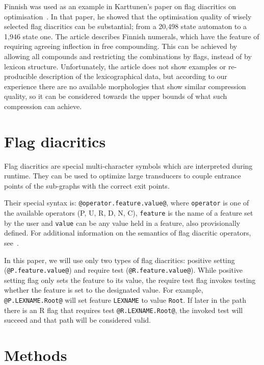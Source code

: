 \documentclass[10pt, a4paper]{article}
\begin{document}
Finnish was used as an example in Karttunen's paper on flag diacritics
on optimisation~. In that paper, he
showed that the optimisation quality of wisely selected flag
diacritics can be substantial; from a 20,498 state automaton to a
1,946 state one. The article describes Finnish numerals, which have
the feature of requiring agreeing inflection in free compounding. This
can be achieved by allowing all compounds and restricting the
combinations by flags, instead of by lexicon structure. Unfortunately,
the article does not show examples or re-producible description of the
lexicographical data, but according to our experience there are no available
morphologies that show similar compression quality, so it can be
considered towards the upper bounds of what such compression can
achieve.
 
\section{Flag diacritics}
\label{sec:flags}

Flag diacritics are special multi-character symbols which are interpreted during runtime. They can be used to optimize large transducers to couple entrance points of the sub-graphs with the correct exit points.

Their special syntax is: \verb+@operator.feature.value@+, where
\texttt{operator} is one of the available operators (P, U, R, D, N, C), \texttt{feature} is the name of a feature set by the user and \texttt{value} can be any value held in a feature, also provisionally defined. For additional information on the semantics of flag diacritic operators, see~.


In this paper, we will use only two types of flag diacritics: positive
setting (\verb+@P.feature.value@+) and require test
(\verb+@R.feature.value@+). While positive setting flag only sets the
feature to its value, the require test flag invokes testing whether the
feature is set to the designated value. For example,
\verb+@P.LEXNAME.Root@+ will set feature \texttt{LEXNAME} to value
\texttt{Root}. If later in the path there is an R flag that requires test
\verb+@R.LEXNAME.Root@+, the invoked test will succeed and that path
will be considered valid.



\section{Methods}
\label{sec:methods}
\end{document}
